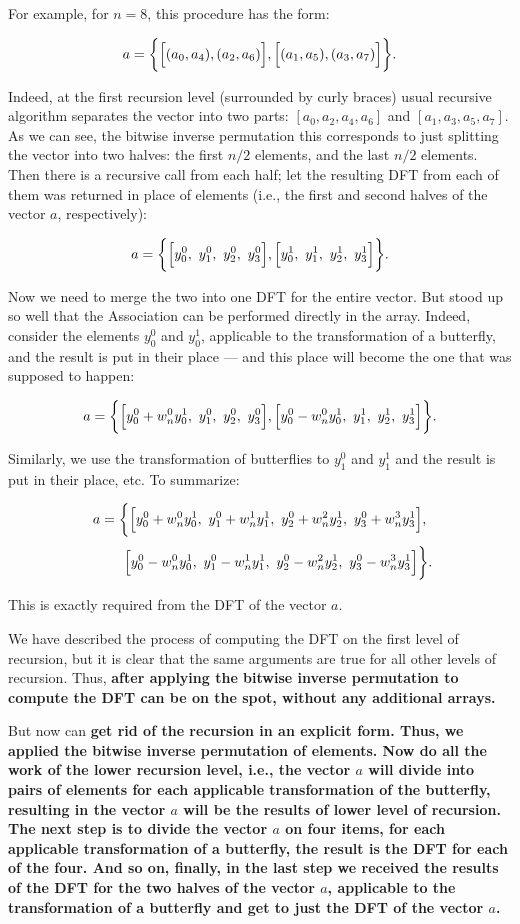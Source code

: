 For example, for $n=8$, this procedure has the form:

$$ a = \biggl\{ \Bigl[ (a_0,a_4), (a_2, a_6) \Bigr] , \Bigl[ (a_1, a_5), (a_3, a_7) \Bigr] \biggr\}. $$

Indeed, at the first recursion level (surrounded by curly braces) usual recursive algorithm separates the vector into two parts: $[a_0,a_2,a_4,a_6]$ and $[a_1,a_3,a_5,a_7]$. As we can see, the bitwise inverse permutation this corresponds to just splitting the vector into two halves: the first $n/2$ elements, and the last $n/2$ elements. Then there is a recursive call from each half; let the resulting DFT from each of them was returned in place of elements (i.e., the first and second halves of the vector $a$, respectively):

$$ a = \biggl\{ \Bigl[ y_0^0,\ y_1^0,\ y_2^0,\ y_3^0 \Bigr], \Bigl[ y_0^1,\ y_1^1,\ y_2^1,\ y_3^1 \Bigr] \biggr\}. $$

Now we need to merge the two into one DFT for the entire vector. But stood up so well that the Association can be performed directly in the array. Indeed, consider the elements $y_0^0$ and $y_0^1$, applicable to the transformation of a butterfly, and the result is put in their place --- and this place will become the one that was supposed to happen:

$$ a = \biggl\{ \Bigl[ y_0^0+w_n^0y_0^1,\ y_1^0,\ y_2^0,\ y_3^0 \Bigr], \Bigl[ y_0^0-w_n^0y_0^1,\ y_1^1,\ y_2^1,\ y_3^1 \Bigr] \biggr\}. $$

Similarly, we use the transformation of butterflies to $y_1^0$ and $y_1^1$ and the result is put in their place, etc. To summarize:

$$ a = \biggl\{ \Bigl[ y_0^0+w_n^0y_0^1,\ y_1^0+w_n^1y_1^1,\ y_2^0+w_n^2y_2^1,\ y_3^0+w_n^3y_3^1 \Bigr], $$
$$ ~~~~~~~~ \Bigl[ y_0^0-w_n^0y_0^1,\ y_1^0-w_n^1y_1^1,\ y_2^0-w_n^2y_2^1,\ y_3^0-w_n^3y_3^1 \Bigr] \biggr\}. $$

This is exactly required from the DFT of the vector $a$.

We have described the process of computing the DFT on the first level of recursion, but it is clear that the same arguments are true for all other levels of recursion. Thus, \bf{after applying the bitwise inverse permutation to compute the DFT can be on the spot}, without any additional arrays.

But now can \bf{get rid of the recursion} in an explicit form. Thus, we applied the bitwise inverse permutation of elements. Now do all the work of the lower recursion level, i.e., the vector $a$ will divide into pairs of elements for each applicable transformation of the butterfly, resulting in the vector $a$ will be the results of lower level of recursion. The next step is to divide the vector $a$ on four items, for each applicable transformation of a butterfly, the result is the DFT for each of the four. And so on, finally, in the last step we received the results of the DFT for the two halves of the vector $a$, applicable to the transformation of a butterfly and get to just the DFT of the vector $a$.

